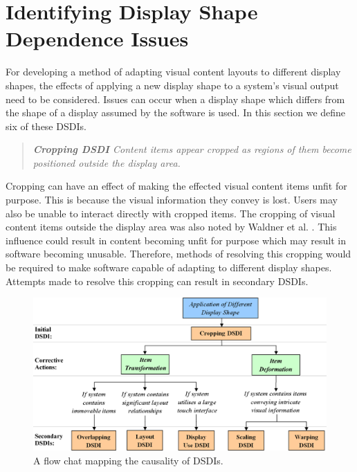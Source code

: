 \documentclass[review,5p,times,twocolumn]{elsarticle}
\begin{document}
\section{Identifying Display Shape Dependence Issues}
\label{sec:problem}

For developing a method of adapting visual content layouts to different display shapes, the effects of applying a new display shape to a system's visual output need to be considered.
Issues can occur when a display shape which differs from the shape of a display assumed by the software is used.
In this section we define six of these \acp{DSDI}.

\begin{quote}\emph{\textbf{Cropping \ac{DSDI}} Content items appear cropped as regions of them become positioned outside the display area.}\end{quote}

Cropping can have an effect of making the effected visual content items unfit for purpose.
This is because the visual information they convey is lost.
Users may also be unable to interact directly with cropped items.
The cropping of visual content items outside the display area was also noted by Waldner et al. \cite{Waldner2011}.
This influence could result in content becoming unfit for purpose which may result in software becoming unusable.
Therefore, methods of resolving this cropping would be required to make software capable of adapting to different display shapes.
Attempts made to resolve this cropping can result in secondary \acp{DSDI}.

 \begin{figure}[t]
 \centering
   \includegraphics[width=1\textwidth]{figures/dsdi_flow.png}
   \caption{A flow chat mapping the causality of \acp{DSDI}.}
   \label{fig:dsdiFlow}
\end{figure}
\end{document}
